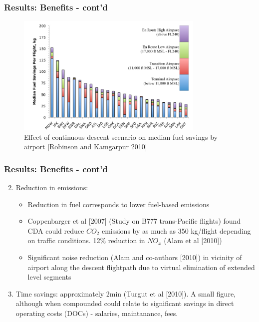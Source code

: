 \documentclass{beamer}
\begin{document}

\begin{frame}
\frametitle{Results: Benefits - cont'd}
\begin{figure}[h!]
\centering
\includegraphics[width=0.8\textwidth]{./figures/Comparison.jpg}\\
{\tiny Effect of continuous descent scenario on median fuel savings by airport [Robinson and Kamgarpur 2010]}
\end{figure}
\end{frame}



\begin{frame}
\frametitle{Results: Benefits - cont'd}

\begin{enumerate}[1.]
\setcounter{enumi}{1}
\item Reduction in emissions:
\begin{itemize}
\item Reduction in fuel corresponds to lower fuel-based emissions
\item Coppenbarger et al [2007] (Study on B777 trans-Pacific flights) found CDA could reduce $CO_2$ emissions by as much as 350 kg/flight depending on traffic conditions. 12\% reduction in $NO_x$ (Alam et al [2010])

\item Significant noise reduction (Alam and co-authors [2010]) in vicinity of airport along the descent flightpath due to virtual elimination of extended level segments

\end{itemize}

\item Time savings: approximately 2min (Turgut et al [2010]). A small figure, although when compounded could relate to significant savings in direct operating costs (DOCs) - salaries, maintanance, fees.


\end{enumerate}

\end{frame}
\end{document}
